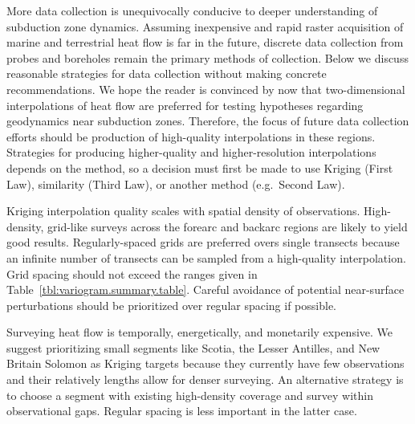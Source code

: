 \documentclass[draft,linenumbers]{agujournal2018}
\begin{document}
More data collection is unequivocally conducive to deeper understanding
of subduction zone dynamics. Assuming inexpensive and rapid raster
acquisition of marine and terrestrial heat flow is far in the future,
discrete data collection from probes and boreholes remain the primary
methods of collection. Below we discuss reasonable strategies for data
collection without making concrete recommendations. We hope the reader
is convinced by now that two-dimensional interpolations of heat flow are
preferred for testing hypotheses regarding geodynamics near subduction
zones. Therefore, the focus of future data collection efforts should be
production of high-quality interpolations in these regions. Strategies
for producing higher-quality and higher-resolution interpolations
depends on the method, so a decision must first be made to use Kriging
(First Law), similarity (Third Law), or another method (e.g.~Second
Law).

Kriging interpolation quality scales with spatial density of
observations. High-density, grid-like surveys across the forearc and
backarc regions are likely to yield good results. Regularly-spaced grids
are preferred overs single transects because an infinite number of
transects can be sampled from a high-quality interpolation. Grid spacing
should not exceed the ranges given in
Table~\ref{tbl:variogram.summary.table}. Careful avoidance of potential
near-surface perturbations should be prioritized over regular spacing if
possible.

Surveying heat flow is temporally, energetically, and monetarily
expensive. We suggest prioritizing small segments like Scotia, the
Lesser Antilles, and New Britain Solomon as Kriging targets because they
currently have few observations and their relatively lengths allow for
denser surveying. An alternative strategy is to choose a segment with
existing high-density coverage and survey within observational gaps.
Regular spacing is less important in the latter case.
\end{document}
